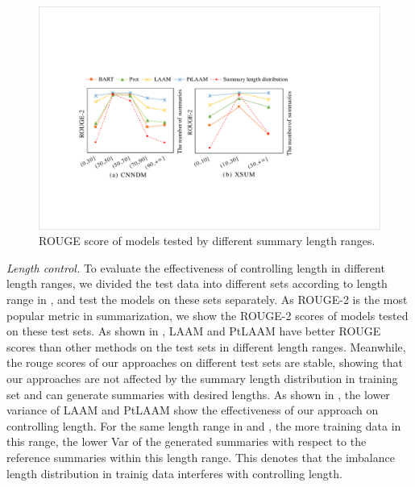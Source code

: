 \begin{figure}[!ht]
	\centering
	\scriptsize
	\includegraphics[width=1\linewidth]{rouge.pdf}
	\caption{ROUGE score of models tested by different summary length ranges.}
	\label{fig:rouge}
\end{figure}

\textit{Length control.} To evaluate the effectiveness of controlling length in different length ranges, we divided the test data into different sets according to length range in , and test the models on these sets separately. 
As ROUGE-2 is the most popular metric in summarization,
we show the ROUGE-2 scores of models tested on these test sets.
As shown in ,
LAAM and PtLAAM have better ROUGE scores than other methods 
on the test sets in different length ranges.
Meanwhile,
the rouge scores of our approaches on different test sets 
are stable, showing that our approaches are
not affected by the summary length distribution in training set 
and can generate summaries with desired lengths.
As shown in , the lower variance of LAAM and PtLAAM show the effectiveness of our approach on controlling length.
For the same length range in  and , the more training data in this range, the lower Var of the generated summaries with respect to the reference summaries within this length range.
This denotes that the imbalance length distribution in trainig data
interferes with controlling length.



